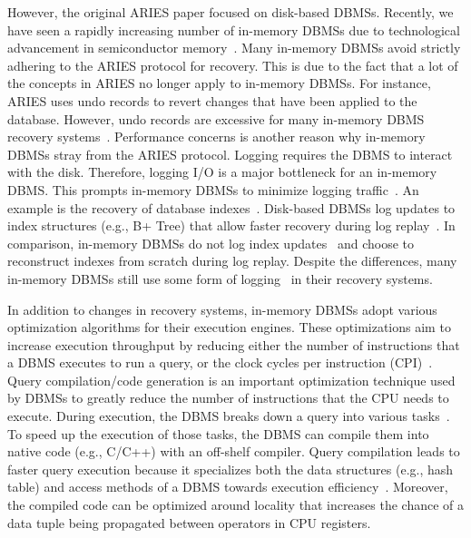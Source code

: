 \documentclass[12pt]{cmuthesis}
\begin{document}
However, the original ARIES paper focused on disk-based DBMSs. Recently, we have seen a rapidly increasing number of in-memory DBMSs due to technological advancement in semiconductor memory~\cite{gar92}. Many in-memory DBMSs avoid strictly adhering to the ARIES protocol for recovery. This is due to the fact that a lot of the concepts in ARIES no longer apply to in-memory DBMSs. For instance, ARIES uses undo records to revert changes that have been applied to the database. However, undo records are excessive for many in-memory DBMS recovery systems~\cite{noisepage, malviya14, hekaton2013, scuba14, silo_r}. Performance concerns is another reason why in-memory DBMSs stray from the ARIES protocol. Logging requires the DBMS to interact with the disk. Therefore, logging I/O is a major bottleneck for an in-memory DBMS. This prompts in-memory DBMSs to minimize logging traffic~\cite{faeber17}. An example is the recovery of database indexes~\cite{faeber17}. Disk-based DBMSs log updates to index structures (e.g., B+ Tree) that allow faster recovery during log replay~\cite{aries}. In comparison, in-memory DBMSs do not log index updates~\cite{hekaton2013, noisepage, malviya14, silo_r} and choose to reconstruct indexes from scratch during log replay. Despite the differences, many in-memory DBMSs still use some form of logging~\cite{noisepage, malviya14, hekaton2013, silo_r} in their recovery systems.

In addition to changes in recovery systems, in-memory DBMSs adopt various optimization algorithms for their execution engines\cite{kersten18}. These optimizations aim to increase execution throughput by reducing either the number of instructions that a DBMS executes to run a query, or the clock cycles per instruction (CPI)~\cite{boncz05}. Query compilation/code generation is an important optimization technique used by DBMSs to greatly reduce the number of instructions that the CPU needs to execute\cite{kersten18}. During execution, the DBMS breaks down a query into various tasks~\cite{noisepage, neumann11}. To speed up the execution of those tasks, the DBMS can compile them into native code (e.g., C/C++) with an off-shelf compiler\cite{boncz05}. Query compilation leads to faster query execution because it specializes both the data structures (e.g., hash table) and access methods of a DBMS towards execution efficiency~\cite{neumann11}. Moreover, the compiled code can be optimized around locality that increases the chance of a data tuple being propagated between operators in CPU registers\cite{menon17}.
\end{document}
